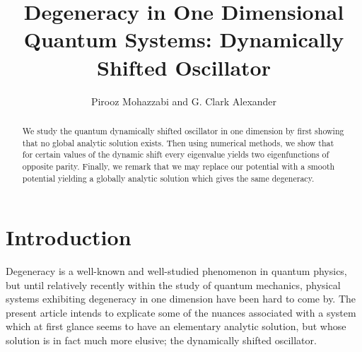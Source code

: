 \documentclass[12pt]{article}
\begin{document}
\title{Degeneracy in One Dimensional Quantum Systems: Dynamically Shifted Oscillator}
\author{Pirooz Mohazzabi and G. Clark Alexander}
\begin{abstract}
\vspace{0.5cm}
We study the quantum dynamically shifted oscillator in one dimension by first showing that no global analytic solution exists. Then using numerical methods, we show that for certain values of the dynamic shift every eigenvalue yields two  eigenfunctions of opposite parity. Finally, we remark that we may replace our potential with a smooth potential yielding a globally analytic solution which gives the same degeneracy.
\end{abstract}
\maketitle
\newpage

\section{Introduction} Degeneracy is a well-known and well-studied phenomenon in quantum physics, but until relatively recently within the study of quantum mechanics, physical systems exhibiting degeneracy in one dimension have been hard to come by. The present article intends to explicate some of the nuances associated with a system which at first glance seems to have an elementary analytic solution, but whose solution is in fact much more elusive; the dynamically shifted oscillator.
\end{document}
